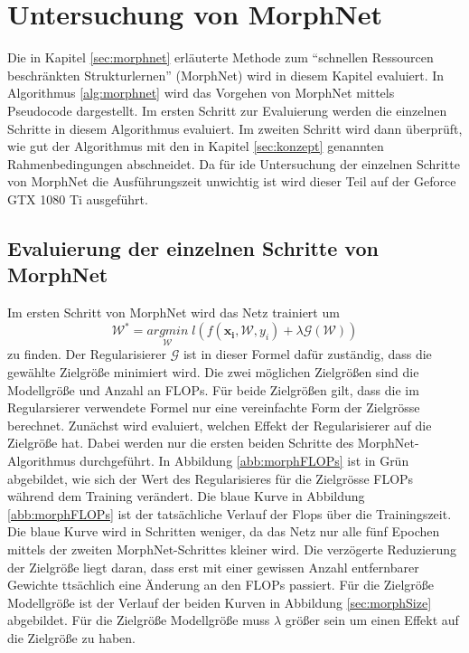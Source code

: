 \chapter{Untersuchung von MorphNet}\label{sec:morphexperimente}

Die in Kapitel \ref{sec:morphnet} erläuterte Methode zum ``schnellen Ressourcen beschränkten Strukturlernen'' (MorphNet) wird in diesem Kapitel evaluiert. In Algorithmus \ref{alg:morphnet} wird das Vorgehen von MorphNet mittels Pseudocode dargestellt. Im ersten Schritt zur Evaluierung werden die einzelnen Schritte in diesem Algorithmus evaluiert. Im zweiten Schritt wird dann überprüft, wie gut der Algorithmus mit den in Kapitel \ref{sec:konzept} genannten Rahmenbedingungen abschneidet. Da für ide Untersuchung der einzelnen Schritte von MorphNet die Ausführungszeit unwichtig ist wird dieser Teil auf der Geforce GTX 1080 Ti ausgeführt.

\section{Evaluierung der einzelnen Schritte von MorphNet}
Im ersten Schritt von MorphNet wird das Netz trainiert um 
\begin{equation}
\mathcal{W}^{\ast}=\underset{\mathcal{W}}{arg min}\; l(f(\mathbf{x_i}, \mathcal{W},y_i) + \lambda \mathcal{G}(\mathcal{W}))
\end{equation}
zu finden. Der Regularisierer $\mathcal{G}$ ist in dieser Formel dafür zuständig, dass die gewählte Zielgröße minimiert wird. Die zwei möglichen Zielgrößen sind die Modellgröße und Anzahl an FLOPs. Für beide Zielgrößen gilt, dass die im Regularsierer verwendete Formel nur eine vereinfachte Form der Zielgrösse berechnet. 
Zunächst wird evaluiert, welchen Effekt der Regularisierer auf die Zielgröße hat. Dabei werden nur die ersten beiden Schritte des MorphNet-Algorithmus durchgeführt.
In Abbildung \ref{abb:morphFLOPs} ist in Grün abgebildet, wie sich der Wert des Regularisieres für die Zielgrösse FLOPs während dem Training verändert. Die blaue Kurve in Abbildung \ref{abb:morphFLOPs} ist der tatsächliche Verlauf der Flops über die Trainingszeit. Die blaue Kurve wird in Schritten weniger, da das Netz nur alle fünf Epochen mittels der zweiten MorphNet-Schrittes kleiner wird. Die verzögerte Reduzierung der Zielgröße liegt daran, dass erst mit einer gewissen Anzahl entfernbarer Gewichte ttsächlich eine Änderung an den FLOPs passiert. Für die Zielgröße Modellgröße ist der Verlauf der beiden Kurven in Abbildung \ref{sec:morphSize} abgebildet. Für die Zielgröße Modellgröße muss $\lambda$ größer sein um einen Effekt auf die Zielgröße zu haben.

